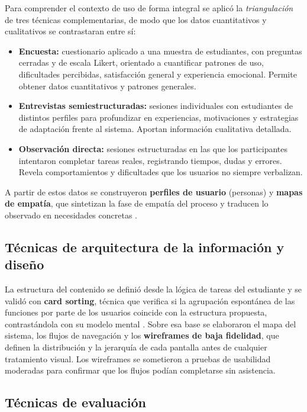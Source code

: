 Para comprender el contexto de uso de forma integral se aplicó la \textit{triangulación} de tres técnicas complementarias, de modo que los datos cuantitativos y cualitativos se contrastaran entre sí:

\begin{itemize}
  \item \textbf{Encuesta:} cuestionario aplicado a una muestra de estudiantes, con preguntas cerradas y de escala Likert, orientado a cuantificar patrones de uso, dificultades percibidas, satisfacción general y experiencia emocional. Permite obtener datos cuantitativos y patrones generales.
  \item \textbf{Entrevistas semiestructuradas:} sesiones individuales con estudiantes de distintos perfiles para profundizar en experiencias, motivaciones y estrategias de adaptación frente al sistema. Aportan información cualitativa detallada.
  \item \textbf{Observación directa:} sesiones estructuradas en las que los participantes intentaron completar tareas reales, registrando tiempos, dudas y errores. Revela comportamientos y dificultades que los usuarios no siempre verbalizan.
\end{itemize}

A partir de estos datos se construyeron \textbf{perfiles de usuario} (personas) y \textbf{mapas de empatía}, que sintetizan la fase de empatía del proceso y traducen lo observado en necesidades concretas \autocite{ixdfPersonas,miroMapaEmpatia,flores2026}.

\subsection{Técnicas de arquitectura de la información y diseño}

La estructura del contenido se definió desde la lógica de tareas del estudiante y se validó con \textbf{card sorting}, técnica que verifica si la agrupación espontánea de las funciones por parte de los usuarios coincide con la estructura propuesta, contrastándola con su modelo mental \autocite{rosenfeld2015}. Sobre esa base se elaboraron el mapa del sistema, los flujos de navegación y los \textbf{wireframes de baja fidelidad}, que definen la distribución y la jerarquía de cada pantalla antes de cualquier tratamiento visual. Los wireframes se sometieron a pruebas de usabilidad moderadas para confirmar que los flujos podían completarse sin asistencia.

\subsection{Técnicas de evaluación}

